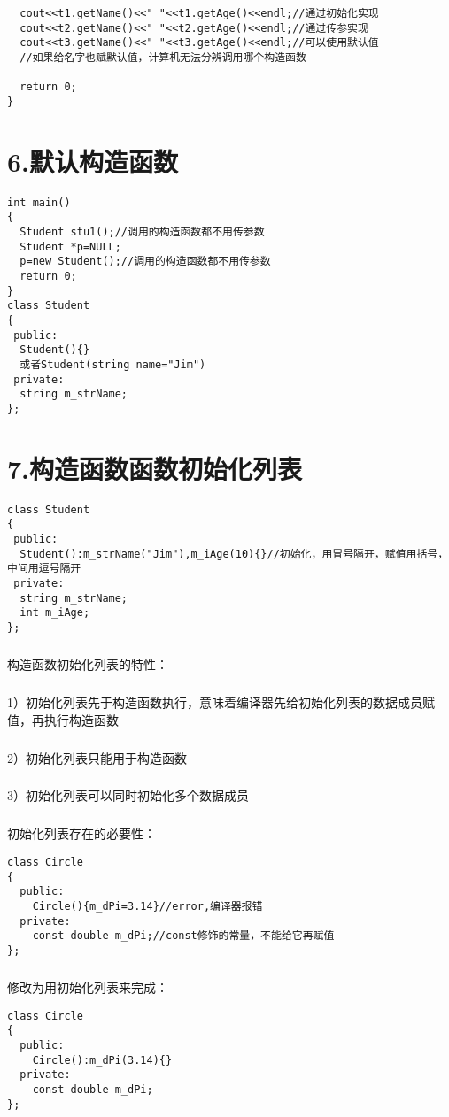 \documentclass{article}
\begin{document}
\begin{CJK}{UTF8}{gbsn}
\begin{verbatim}
  cout<<t1.getName()<<" "<<t1.getAge()<<endl;//通过初始化实现
  cout<<t2.getName()<<" "<<t2.getAge()<<endl;//通过传参实现
  cout<<t3.getName()<<" "<<t3.getAge()<<endl;//可以使用默认值
  //如果给名字也赋默认值，计算机无法分辨调用哪个构造函数

  return 0;
}
\end{verbatim}
\section*{6.默认构造函数}
\begin{verbatim}
int main()
{
  Student stu1();//调用的构造函数都不用传参数
  Student *p=NULL;
  p=new Student();//调用的构造函数都不用传参数
  return 0;
}
class Student
{
 public:
  Student(){}
  或者Student(string name="Jim")
 private:
  string m_strName;
};
\end{verbatim}
\section*{7.构造函数函数初始化列表}
\begin{verbatim}
class Student
{
 public:
  Student():m_strName("Jim"),m_iAge(10){}//初始化，用冒号隔开，赋值用括号，中间用逗号隔开
 private:
  string m_strName;
  int m_iAge;
};
\end{verbatim}
\subparagraph*{}
构造函数初始化列表的特性：
\subparagraph*{}
1）初始化列表先于构造函数执行，意味着编译器先给初始化列表的数据成员赋值，再执行构造函数
\subparagraph*{}
2）初始化列表只能用于构造函数
\subparagraph*{}
3）初始化列表可以同时初始化多个数据成员
\subparagraph*{}
初始化列表存在的必要性：
\begin{verbatim}
class Circle
{
  public:
    Circle(){m_dPi=3.14}//error,编译器报错
  private:
    const double m_dPi;//const修饰的常量，不能给它再赋值
};
\end{verbatim}
\subparagraph*{}
修改为用初始化列表来完成：
\begin{verbatim}
class Circle
{
  public:
    Circle():m_dPi(3.14){}
  private:
    const double m_dPi;
};
\end{verbatim}

\end{CJK}
\end{document}
